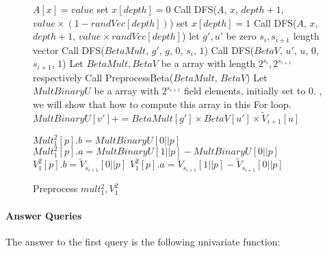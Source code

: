 \begin{figure}[p]
\begin{algorithm}[H]
\label{alg::parttwo}
\caption{Preprocess $mult_1^2, V_1^2$}
\begin{algorithmic}[1]
		\State $A[x]=value$
	\Else
		\State set $x[depth]=0$
		\State Call DFS($A$, $x$, $depth + 1$, $value \times (1-randVec[depth])$)
		\State set $x[depth]=1$
		\State Call DFS($A$, $x$, $depth + 1$, $value \times randVec[depth]$)
	\EndIf
\EndProcedure
{}
	\State let $g', u'$ be zero $s_{i}, s_{i+1}$ length vector
	\State Call {\sf DFS}($BetaMult$, $g'$, $g$, $0$, $s_{i}$, $1$)
	\State Call {\sf DFS}($BetaV$, $u'$, $u$, $0$, $s_{i + 1}$, $1$)
\EndProcedure
{}
	\State Let $BetaMult, BetaV$ be a array with length $2^{s_{i}}, 2^{s_{i+1}}$ respectively
	\State Call {\sf PreprocessBeta}($BetaMult$, $BetaV$)
	\State Let $MultBinaryU$ be a array with $2^{s_{i+1}}$ field elements, initially set to $0$.
	, we will show that how to compute this array in this For loop.
			\State $MultBinaryU[v'] += BetaMult[g'] \times BetaV[u'] \times \tilde{V}_{i+1}[u]$
		\EndFor
	\EndFor

		\State $Mult_1^2[p].b = MultBinaryU[0||p]$
		\State $Mult_1^2[p].a = MultBinaryU[1||p]-MultBinaryU[0||p]$
		\State $V_1^2[p].b = \tilde{V}_{s_{i+1}}[0||p]$
		\State $V_1^2[p].a = \tilde{V}_{s_{i+1}}[1||p]-\tilde{V}_{s_{i+1}}[0||p]$
	\EndFor
\EndProcedure
\end{algorithmic}
\end{algorithm}
\end{figure}

\paragraph*{Answer Queries}
The answer to the first query is the following univariate function:

